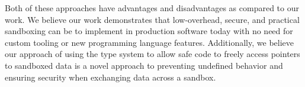 Both of these approaches have advantages and disadvantages as compared to our work. We believe our
work demonstrates that low-overhead, secure, and practical sandboxing can be to implement in
production software today with no need for custom tooling or new programming language features.
Additionally, we believe our approach of using the type system to allow safe code to freely access
pointers to sandboxed data is a novel approach to preventing undefined behavior and ensuring
security when exchanging data across a sandbox.
